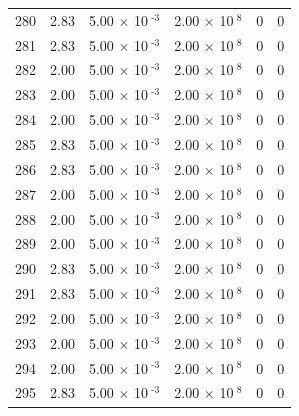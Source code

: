 \documentclass[a4paper,11pt]{article}
\begin{document}
\begin{center}
\begin{longtable}{|R{1.5cm}|R{2.4cm}|R{2.4cm}|R{2.4cm}|R{2.4cm}|R{2.4cm}|}
  280 &   2.83  &         5.00 $\times$ 10$^{\text{          -3}}$  &         2.00 $\times$ 10$^{\text{           8}}$  & 0  & 0 \\
  281 &   2.83  &         5.00 $\times$ 10$^{\text{          -3}}$  &         2.00 $\times$ 10$^{\text{           8}}$  & 0  & 0 \\
  282 &   2.00  &         5.00 $\times$ 10$^{\text{          -3}}$  &         2.00 $\times$ 10$^{\text{           8}}$  & 0  & 0 \\
  283 &   2.00  &         5.00 $\times$ 10$^{\text{          -3}}$  &         2.00 $\times$ 10$^{\text{           8}}$  & 0  & 0 \\
  284 &   2.00  &         5.00 $\times$ 10$^{\text{          -3}}$  &         2.00 $\times$ 10$^{\text{           8}}$  & 0  & 0 \\
  285 &   2.83  &         5.00 $\times$ 10$^{\text{          -3}}$  &         2.00 $\times$ 10$^{\text{           8}}$  & 0  & 0 \\
  286 &   2.83  &         5.00 $\times$ 10$^{\text{          -3}}$  &         2.00 $\times$ 10$^{\text{           8}}$  & 0  & 0 \\
  287 &   2.00  &         5.00 $\times$ 10$^{\text{          -3}}$  &         2.00 $\times$ 10$^{\text{           8}}$  & 0  & 0 \\
  288 &   2.00  &         5.00 $\times$ 10$^{\text{          -3}}$  &         2.00 $\times$ 10$^{\text{           8}}$  & 0  & 0 \\
  289 &   2.00  &         5.00 $\times$ 10$^{\text{          -3}}$  &         2.00 $\times$ 10$^{\text{           8}}$  & 0  & 0 \\
  290 &   2.83  &         5.00 $\times$ 10$^{\text{          -3}}$  &         2.00 $\times$ 10$^{\text{           8}}$  & 0  & 0 \\
  291 &   2.83  &         5.00 $\times$ 10$^{\text{          -3}}$  &         2.00 $\times$ 10$^{\text{           8}}$  & 0  & 0 \\
  292 &   2.00  &         5.00 $\times$ 10$^{\text{          -3}}$  &         2.00 $\times$ 10$^{\text{           8}}$  & 0  & 0 \\
  293 &   2.00  &         5.00 $\times$ 10$^{\text{          -3}}$  &         2.00 $\times$ 10$^{\text{           8}}$  & 0  & 0 \\
  294 &   2.00  &         5.00 $\times$ 10$^{\text{          -3}}$  &         2.00 $\times$ 10$^{\text{           8}}$  & 0  & 0 \\
  295 &   2.83  &         5.00 $\times$ 10$^{\text{          -3}}$  &         2.00 $\times$ 10$^{\text{           8}}$  & 0  & 0 \\

\end{longtable}
\end{center}
\end{document}
